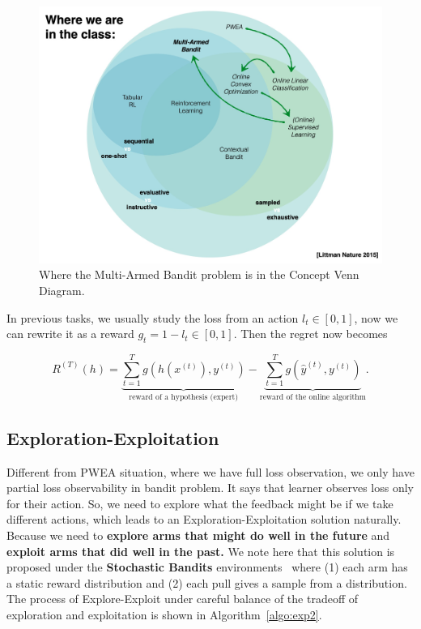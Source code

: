 \documentclass[11pt]{article}
\begin{document}
\begin{figure}[H]
    \centering
    \includegraphics[width=.7\linewidth]{lecture_11_B/figs/multiarm_bandit.png}
    \caption{Where the Multi-Armed Bandit problem is in the Concept Venn Diagram.}
    \label{fig:MAB}
\end{figure}

In previous tasks, we usually study the loss from an action $l_t \in [0,1]$, now we can rewrite it as a reward $g_t = 1 - l_t \in [0,1]$. Then the regret now becomes

\begin{equation}
    R^{(T)}(h) = \underbrace{\sum_{t=1}^T g(h(x^{(t)}), y^{(t)})}_{\text{reward of a hypothesis (expert)}} - \underbrace{\sum_{t=1}^T g(\hat{y}^{(t)}, y^{(t)})}_{\text{reward of the online algorithm}}.
\end{equation}

\subsection{Exploration-Exploitation}
Different from PWEA situation, where we have full loss observation, we only have partial loss observability in bandit problem. It says that learner observes loss only for their action. So, we need to explore what the feedback might be if we take different actions, which leads to an Exploration-Exploitation solution naturally. Because we need to \textbf{explore arms that might do well in the future} and \textbf{exploit arms that did well in the past.} We note here that this solution is proposed under the \textbf{Stochastic Bandits} environments~\cite{robbins1952some} where (1) each arm has a static reward distribution and (2) each pull gives a sample from a distribution. The process of Explore-Exploit under careful balance of the tradeoff of exploration and exploitation is shown in Algorithm~\ref{algo:exp2}.
\end{document}
